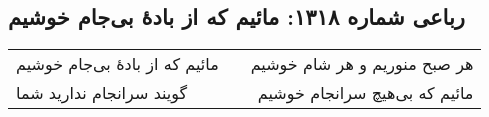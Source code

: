 \begin{center}
\section*{رباعی شماره ۱۳۱۸: مائیم که از بادهٔ بی‌جام خوشیم}
\label{sec:1318}
\begin{longtable}{l p{0.5cm} r}
مائیم که از بادهٔ بی‌جام خوشیم
&&
هر صبح منوریم و هر شام خوشیم
\\
گویند سرانجام ندارید شما
&&
مائیم که بی‌هیچ سرانجام خوشیم
\\
\end{longtable}
\end{center}
